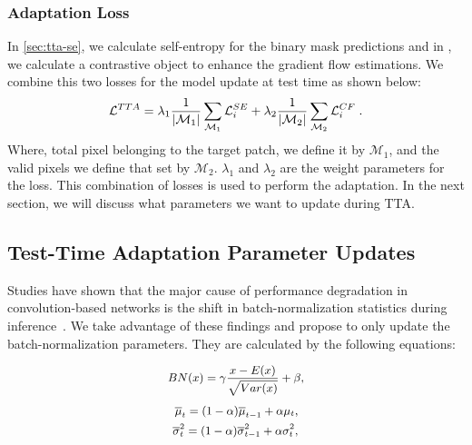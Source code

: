\subsubsection{Adaptation Loss}
In \cref{sec:tta-se}, we calculate self-entropy for the binary mask predictions and in , we calculate a contrastive object to enhance the gradient flow estimations. We combine this two losses for the model update at test time as shown below:
\begin{equation}
    \small
    \mathcal{L}^{TTA} = \lambda_1\frac{1}{| \mathcal{M}_1 |} \sum_{\mathcal{M}_{1}} \mathcal{L}^{SE}_i + \lambda_2\frac{1}{| \mathcal{M}_2 |} \sum_{\mathcal{M}_2} \mathcal{L}^{CF}_i \; .
    \label{eq-tta-loss}
  \end{equation}
Where, total pixel belonging to the target patch, we define it by $\mathcal{M}_1$, and the valid pixels we define that set by $\mathcal{M}_2$. $\lambda_1$ and $\lambda_2$ are the weight parameters for the loss. This combination of losses is used to perform the adaptation. In the next section, we will discuss what parameters we want to update during TTA. 

\subsection{Test-Time Adaptation Parameter Updates}
Studies have shown that the major cause of performance degradation in convolution-based networks is the shift in batch-normalization statistics during inference~\cite{wang2020tent,niu2022efficient,zaveri2025improving,li2016revisiting,mirza2022norm,pan2018two,schneider2020improving}. We take advantage of these findings and propose to only update the batch-normalization parameters. They are calculated by the following equations:

\begin{equation}\small
    \centering
    \label{eq:bn}
        \begin{aligned}  
        BN(x) = \gamma \frac{x - E(x)}{\sqrt{Var(x)}} +  \beta ,
        \end{aligned}
\end{equation}
\begin{equation}\small
    \centering
    \label{eq:bn_running}
        \begin{aligned}  
            \overline{\mu}_t = (1-\alpha)  \overline{\mu}_{t-1} +  \alpha  {\mu}_t ,\\
            \overline{\sigma}_{t}^2 = (1-\alpha) \overline{\sigma}_{t-1}^2 +  \alpha {\sigma}_{t}^2 ,
        \end{aligned}
\end{equation}

